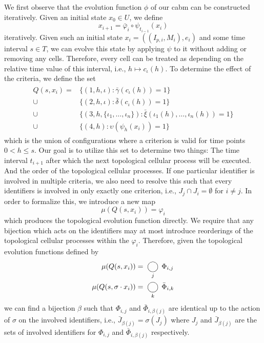 We first observe that the evolution function $\phi$ of our \ac{cabm} can be constructed iteratively.
Given an initial state $x_0\in U$, we define
\begin{equation}
    x_{i+1} = \bar{\varphi}_i\circ\psi_{t_{i-1}}(x_i)
\end{equation}
iteratively.
Given such an initial state $x_i=((I_{p,i},M_i),e_i)$ and some time interval $s\in T$, we can evolve
this state by applying $\psi$ to it without adding or removing any cells.
Therefore, every cell can be treated as depending on the relative time value of this interval, i.e.,
$h\mapsto c_\iota(h)$.
To determine the effect of the criteria, we define the set
\begin{align}
    \begin{split}
        Q(s,x_i) = &\{(1,h,\iota):\bar{\gamma}(c_\iota(h))=1\}\\
            \cup&\{(2,h,\iota):\bar{\delta}(c_\iota(h))=1\}\\
            \cup&\{(3,h,\{\iota_1,\dots,\iota_n\}):\bar{\xi}(\iota_1(h),\dots,\iota_n(h))=1\}\\
            \cup&\{(4,h):\upsilon(\psi_h(x_i))=1\}
    \end{split}
\end{align}
which is the union of configurations where a criterion is valid for time points $0<h\leq s$.
Our goal is to utilize this set to determine two things: The time interval $t_{i+1}$ after which the
next topological cellular process will be executed.
And the order of the topological cellular processes.
If one particular identifier is involved in multiple criteria, we also need to resolve this such
that every identifiers is involved in only exactly one criterion, i.e., $J_j\cap J_i=\emptyset$ for
$i\neq j$.
In order to formalize this, we introduce a new map
\begin{equation}
    \mu(Q(s,x_i))=\varphi_i
\end{equation}
which produces the topological evolution function directly.
We require that any bijection which acts on the identifiers may at most introduce reorderings of the
topological cellular processes within the $\varphi_i$.
Therefore, given the topological evolution functions defined by
\begin{align}
    \mu(Q(s,x_i)) &= \bigcomp_j\Phi_{i,j}
    \label{eq:resolver-property-1}\\
    \mu(Q(s,\sigma\cdot x_i)) &= \bigcomp_k\bar{\Phi}_{i,k}
    \label{eq:resolver-property-2}
\end{align}
we can find a bijection $\beta$ such that $\Phi_{i,j}$ and $\bar{\Phi}_{i,\beta(j)}$ are identical
up to the action of $\sigma$ on the involved identifiers, i.e.,
$\bar{J}_{\beta(j)}=\sigma(J_j)$ where $J_j$ and $\bar{J}_{\beta(j)}$ are the sets of involved
identifiers for $\Phi_{i,j}$ and $\bar{\Phi}_{i,\beta(j)}$ respectively.

